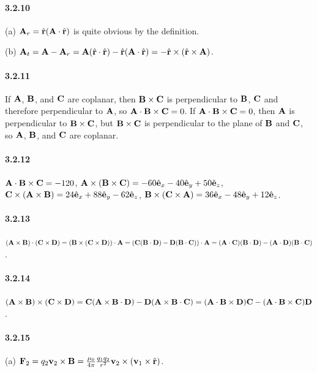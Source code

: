 \documentclass[a4paper]{article}
\begin{document}
\paragraph{3.2.10}
(a) $\mathbf{A}_r=\hat{\mathbf{r}}(\mathbf{A}\cdot\hat{\mathbf{r}})$ is quite obvious by the definition.

(b) $\mathbf{A}_t=\mathbf{A}-\mathbf{A}_r=\mathbf{A}(\hat{\mathbf{r}}\cdot\hat{\mathbf{r}})-\hat{\mathbf{r}}(\mathbf{A}\cdot\hat{\mathbf{r}})=-\hat{\mathbf{r}}\times(\hat{\mathbf{r}}\times\mathbf{A})$.

\paragraph{3.2.11}
If $\mathbf{A}$, $\mathbf{B}$, and $\mathbf{C}$ are coplanar, then $\mathbf{B}\times\mathbf{C}$ is perpendicular to  $\mathbf{B}$, $\mathbf{C}$ and therefore perpendicular to $\mathbf{A}$, so $\mathbf{A}\cdot\mathbf{B}\times\mathbf{C}=0$. If $\mathbf{A}\cdot\mathbf{B}\times\mathbf{C}=0$, then $\mathbf{A}$ is perpendicular to $\mathbf{B}\times\mathbf{C}$, but $\mathbf{B}\times\mathbf{C}$ is perpendicular to the plane of $\mathbf{B}$ and $\mathbf{C}$, so $\mathbf{A}$, $\mathbf{B}$, and $\mathbf{C}$ are coplanar.

\paragraph{3.2.12}
$\mathbf{A}\cdot\mathbf{B}\times\mathbf{C}=-120$, $\mathbf{A}\times(\mathbf{B}\times\mathbf{C})=-60\hat{\mathbf{e}}_x-40\hat{\mathbf{e}}_y+50\hat{\mathbf{e}}_z$, $\mathbf{C}\times(\mathbf{A}\times\mathbf{B})=24\hat{\mathbf{e}}_x+88\hat{\mathbf{e}}_y-62\hat{\mathbf{e}}_z$, $\mathbf{B}\times(\mathbf{C}\times\mathbf{A})=36\hat{\mathbf{e}}_x-48\hat{\mathbf{e}}_y+12\hat{\mathbf{e}}_z$.

\paragraph{3.2.13}
$(\mathbf{A}\times\mathbf{B})\cdot(\mathbf{C}\times\mathbf{D})=(\mathbf{B}\times(\mathbf{C}\times\mathbf{D}))\cdot\mathbf{A}=(\mathbf{C}(\mathbf{B}\cdot\mathbf{D})-\mathbf{D}(\mathbf{B}\cdot\mathbf{C}))\cdot\mathbf{A}=(\mathbf{A}\cdot\mathbf{C})(\mathbf{B}\cdot\mathbf{D})-(\mathbf{A}\cdot\mathbf{D})(\mathbf{B}\cdot\mathbf{C})$.

\paragraph{3.2.14}
$(\mathbf{A}\times\mathbf{B})\times(\mathbf{C}\times\mathbf{D})=\mathbf{C}(\mathbf{A}\times\mathbf{B}\cdot\mathbf{D})-\mathbf{D}(\mathbf{A}\times\mathbf{B}\cdot\mathbf{C})=(\mathbf{A}\cdot\mathbf{B}\times\mathbf{D})\mathbf{C}-(\mathbf{A}\cdot\mathbf{B}\times\mathbf{C})\mathbf{D}$.

\paragraph{3.2.15}
(a) $\mathbf{F}_2=q_2\mathbf{v}_2\times\mathbf{B}=\frac{\mu_0}{4\pi}\frac{q_1q_2}{r^2}\mathbf{v}_2\times(\mathbf{v}_1\times\hat{\mathbf{r}})$.
\end{document}
